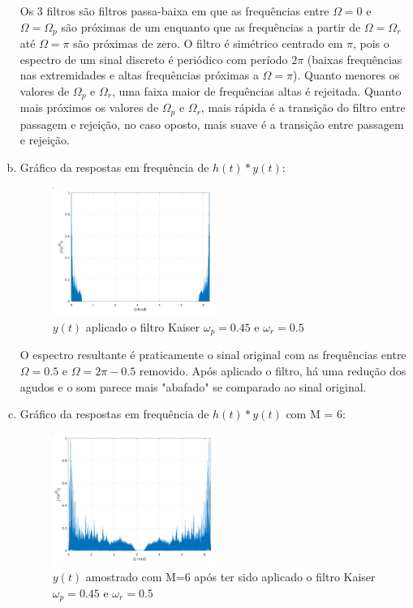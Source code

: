 \documentclass{article}
\begin{document}
\begin{enumerate}[(a)]
        Os 3 filtros são filtros passa-baixa em que as frequências entre $\Omega = 0$ e $\Omega = \Omega_p$ são próximas de um enquanto que as frequências a partir de $\Omega = \Omega_r$ até $\Omega = \pi$ são próximas de zero. O filtro é simétrico centrado em $\pi$, pois o espectro de um sinal discreto é periódico com período $2\pi$ (baixas frequências nas extremidades e altas frequências próximas a $\Omega = \pi$). Quanto menores os valores de $\Omega_p$ e $\Omega_r$, uma faixa maior de frequências altas é rejeitada. Quanto mais próximos os valores de $\Omega_p$ e $\Omega_r$, mais rápida é a transição do filtro entre passagem e rejeição, no caso oposto, mais suave é a transição entre passagem e rejeição.

\break\vfill

\item
    Gráfico da respostas em frequência de $h(t)*y(t)$:

    \begin{figure}[H]
    \centering
    \includegraphics[width=0.5\textwidth]{images/conv_h.png}
        \caption{$y(t)$ aplicado o filtro Kaiser $\omega_p = 0.45$ e $\omega_r = 0.5$}
    \end{figure}

    O espectro resultante é praticamente o sinal original com as frequências entre $\Omega = 0.5 \text{ e } \Omega = 2\pi - 0.5$ removido.
    Após aplicado o filtro, há uma redução dos agudos e o som parece mais "abafado" se comparado ao sinal original.

\item
    Gráfico da respostas em frequência de $h(t)*y(t)$ com M = 6:

    \begin{figure}[H]
    \centering
    \includegraphics[width=0.5\textwidth]{images/resamp_after_filter.png}
        \caption{$y(t)$ amostrado com M=6 após ter sido aplicado o filtro Kaiser $\omega_p = 0.45$ e $\omega_r = 0.5$}
    \end{figure}


\end{enumerate}
\end{document}
